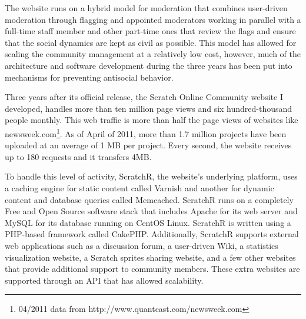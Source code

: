 The website runs on a hybrid model for moderation that combines user-driven moderation through flagging and appointed moderators working in parallel with a full-time staff member and other part-time ones that review the flags and ensure that the social dynamics are kept as civil as possible. 
This model has allowed for scaling the community management at a relatively low cost, however, much of the architecture and software development during the three years has been put into mechanisms for preventing antisocial behavior.

Three years after its official release, the Scratch Online Community website I developed, handles more than ten million page views and six hundred-thousand people monthly.
This web traffic is more than half the page views of websites like newsweek.com\footnote{04/2011 data from http://www.quantcast.com/newsweek.com}.
As of April of 2011, more than 1.7 million projects have been uploaded at an average of 1 MB per project. 
Every second, the website receives up to 180 requests and it transfers 4MB.

To handle this level of activity, ScratchR, the website's underlying platform, uses a caching engine for static content called Varnish and another for dynamic content and database queries called Memcached. 
ScratchR runs on a completely Free and Open Source software stack that includes Apache for its web server and MySQL for its database running on CentOS Linux. 
ScratchR is written using a PHP-based framework called CakePHP.
Additionally, ScratchR supports external  web applications such as a discussion forum, a user-driven Wiki, a statistics visualization website, a Scratch sprites sharing website, and a few other websites that provide additional support to community members. 
These extra websites are supported through an API that has allowed scalability.
